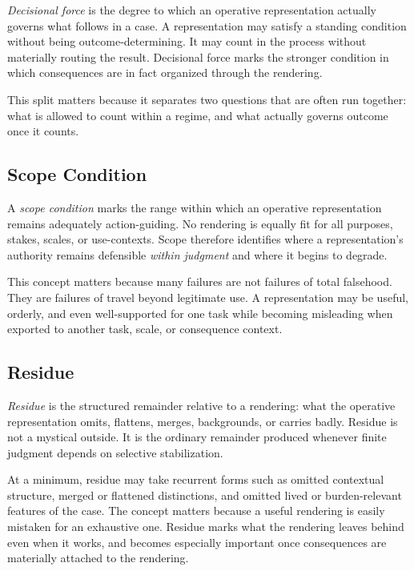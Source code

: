 \documentclass[11pt]{article}
\renewcommand{\emph}[1]{\textit{#1}}
\begin{document}
\emph{Decisional force} is the degree to which an operative representation actually governs what follows in a case. A representation may satisfy a standing condition without being outcome-determining. It may count in the process without materially routing the result. Decisional force marks the stronger condition in which consequences are in fact organized through the rendering.

This split matters because it separates two questions that are often run together: what is allowed to count within a regime, and what actually governs outcome once it counts.

\subsection{Scope Condition}

A \emph{scope condition} marks the range within which an operative representation remains adequately action-guiding. No rendering is equally fit for all purposes, stakes, scales, or use-contexts. Scope therefore identifies where a representation's authority remains defensible \emph{within judgment} and where it begins to degrade.

This concept matters because many failures are not failures of total falsehood. They are failures of travel beyond legitimate use. A representation may be useful, orderly, and even well-supported for one task while becoming misleading when exported to another task, scale, or consequence context.

\subsection{Residue}

\emph{Residue} is the structured remainder relative to a rendering: what the operative representation omits, flattens, merges, backgrounds, or carries badly. Residue is not a mystical outside. It is the ordinary remainder produced whenever finite judgment depends on selective stabilization.

At a minimum, residue may take recurrent forms such as omitted contextual structure, merged or flattened distinctions, and omitted lived or burden-relevant features of the case. The concept matters because a useful rendering is easily mistaken for an exhaustive one. Residue marks what the rendering leaves behind even when it works, and becomes especially important once consequences are materially attached to the rendering.
\end{document}
